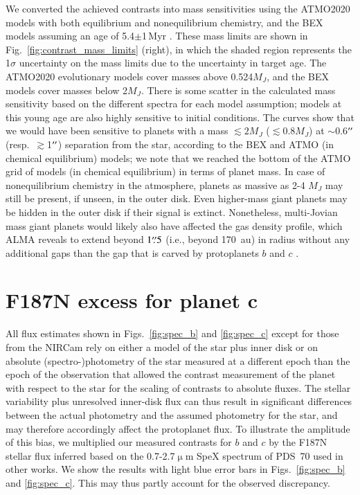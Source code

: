 \documentclass[longauth]{aa}
\newcommand{\vc}[1]{#1}
\begin{document}
\begin{appendix}
We converted the achieved contrasts into mass sensitivities using the ATMO2020 models \citep{Phillips2020} with both equilibrium and nonequilibrium chemistry, and the BEX models \citep{Linder2019} assuming an age of 5.4$\pm$1\,Myr \citep{Muller2018}. These mass limits are shown in Fig.~\ref{fig:contrast_mass_limits} (right), in which the shaded region represents the 1$\sigma$ uncertainty on the mass limits due to the uncertainty in target age. The ATMO2020 evolutionary models cover masses above 0.524$M_J$, and the BEX models cover masses below 2$M_J$. There is some scatter in the calculated mass sensitivity based on the different spectra for each model assumption; models at this young age are also highly sensitive to initial conditions.
The curves show that we would have been sensitive to planets with a mass $\lesssim 2 M_J$ ($\lesssim$0.8$M_J$) at $\sim$0.6$^{\prime\prime}$ (resp.~$\gtrsim$1$^{\prime\prime}$) separation from the star, according to the BEX and ATMO (in chemical equilibrium) models; we note that we reached the bottom of the ATMO grid of models (in chemical equilibrium) in terms of planet mass. In case of nonequilibrium chemistry in the atmosphere, planets as massive as 2-4 $M_J$ may still be present, if unseen, in the outer disk.
Even higher-mass giant planets may be hidden in the outer disk \vc{if} their signal is extinct. Nonetheless, multi-Jovian mass giant planets would likely also have affected the gas density profile, which ALMA reveals to extend beyond $1\overset{\prime\prime}{.}5$ (i.e., beyond 170~au) in radius without any additional gaps than the gap that is carved by protoplanets $b$ and $c$ \citep{Keppler2019}.

\section[The F187N excess for planet c]{F187N excess for planet {\sf c}}\label{sec:F187N_excess}

All flux estimates shown in Figs.~\ref{fig:spec_b} and \ref{fig:spec_c} except for those from the NIRCam rely on either a model of the star plus inner disk or on absolute (spectro-)photometry of the star measured at a different epoch than the epoch of the observation that allowed the contrast measurement of the planet with respect to the star 
for the scaling of contrasts to absolute fluxes. The stellar variability plus unresolved inner-disk flux \citep{Casassus2022, Perotti2023} can thus result in significant differences between the actual photometry and the assumed photometry for the star, and may therefore accordingly affect the protoplanet flux. To illustrate the amplitude of this bias, we multiplied our measured contrasts for $b$ and $c$ by the F187N stellar flux inferred based on the 0.7-2.7$\upmu$m SpeX spectrum of PDS~70 \citep[][]{Long2018} used in other works. We show the results with light blue error bars in Figs.~\ref{fig:spec_b} and \ref{fig:spec_c}. This may thus partly account for the observed discrepancy.


\end{appendix}
\end{document}
